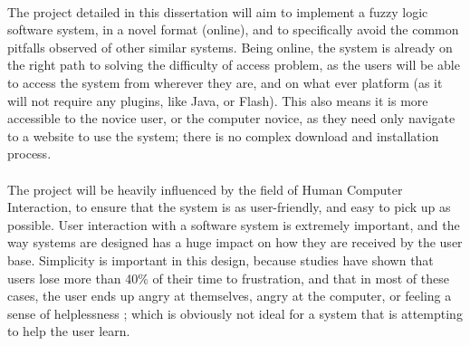 \ \\
The project detailed in this dissertation will aim to implement a fuzzy logic software system, in a novel format (online), and to specifically avoid the common pitfalls observed of other similar systems. Being online, the system is already on the right path to solving the difficulty of access problem, as the users will be able to access the system from wherever they are, and on what ever platform (as it will not require any plugins, like Java, or Flash). This also means it is more accessible to the novice user, or the computer novice, as they need only navigate to a website to use the system; there is no complex download and installation process.
\ \\
\ \\
The project will be heavily influenced by the field of Human Computer Interaction, to ensure that the system is as user-friendly, and easy to pick up as possible. User interaction with a software system is extremely important, and the way systems are designed has a huge impact on how they are received by the user base. Simplicity is important in this design, because studies have shown that users lose more than 40\% of their time to frustration, and that in most of these cases, the user ends up angry at themselves, angry at the computer, or feeling a sense of helplessness \cite{lazar2006workplace}; which is obviously not ideal for a system that is attempting to help the user learn.